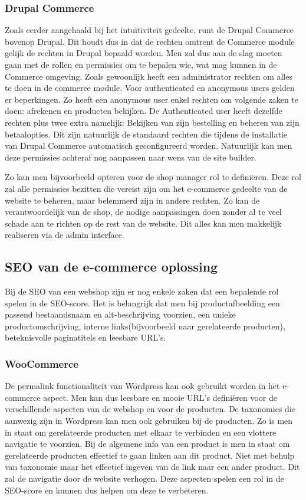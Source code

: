 \subsubsection{Drupal Commerce}
Zoals eerder aangehaald bij het intuïtiviteit gedeelte, runt de Drupal Commerce bovenop Drupal. Dit houdt dus in dat de rechten omtrent de Commerce module gelijk de rechten in Drupal bepaald worden. Men zal dus aan de slag moeten gaan met de rollen en permissies om te bepalen wie, wat mag kunnen in de Commerce omgeving. Zoals gewoonlijk heeft een administrator rechten om alles te doen in de commerce module. Voor authenticated en anonymous users gelden er beperkingen. Zo heeft een anonymous user enkel rechten om volgende zaken te doen: afrekenen en producten bekijken. De Authenticated user heeft dezelfde rechten plus twee extra namelijk: Bekijken van zijn bestelling en beheren van zijn betaalopties. Dit zijn natuurlijk de standaard rechten die tijdens de installatie van Drupal Commerce automatisch geconfigureerd worden. Natuurlijk kan men deze permissies achteraf nog aanpassen naar wens van de site builder. 

Zo kan men bijvoorbeeld opteren voor de shop manager rol te definiëren. Deze rol zal alle permissies bezitten die vereist zijn om het e-commerce gedeelte van de website te beheren, maar belemmerd zijn in andere rechten. Zo kan de verantwoordelijk van de shop, de nodige aanpassingen doen zonder al te veel schade aan te richten op de rest van de website. Dit alles kan men makkelijk realiseren via de admin interface.
\subsection{SEO van de e-commerce oplossing}
Bij de SEO van een webshop zijn er nog enkele zaken dat een bepalende rol spelen in de SEO-score. Het is belangrijk dat men bij productafbeelding een passend bestaandsnaam en alt-beschrijving voorzien, een unieke productomschrijving, interne links(bijvoorbeeld naar gerelateerde producten), beteknisvolle paginatitels en leesbare URL's.
\subsubsection{WooCommerce}
De permalink functionaliteit van Wordpress kan ook gebruikt worden in het e-commerce aspect. Men kan dus leesbare en mooie URL's definiëren voor de verschillende aspecten van de webshop en voor de producten. De taxonomies die aanwezig zijn in Wordpress kan men ook gebruiken bij de producten. Zo is men in staat om gerelateerde producten met elkaar te verbinden en een vlottere navigatie te voorzien. Bij de algemene info van een product is men in staat om gerelateerde producten effectief te gaan linken aan dit product. Niet met behulp van taxonomie maar het effectief ingeven van de link naar een ander product. Dit zal de navigatie door de website verhogen. Deze aspecten spelen een rol in de SEO-score en kunnen dus helpen om deze te verbeteren.
